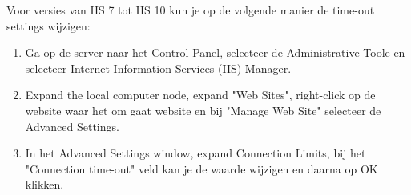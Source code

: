 Voor versies van IIS 7 tot IIS 10 kun je op de volgende manier de time-out settings wijzigen:
\begin{enumerate}
\item Ga op de server naar het Control Panel, selecteer de Administrative Toole en selecteer Internet Information Services (IIS) Manager.
\item Expand the local computer node, expand "Web Sites", right-click op de website waar het om gaat website en bij "Manage Web Site" selecteer de Advanced Settings.
\item In het Advanced Settings window, expand Connection Limits, bij het "Connection time-out" veld kan je de waarde wijzigen en daarna op OK klikken.
\end{enumerate}

